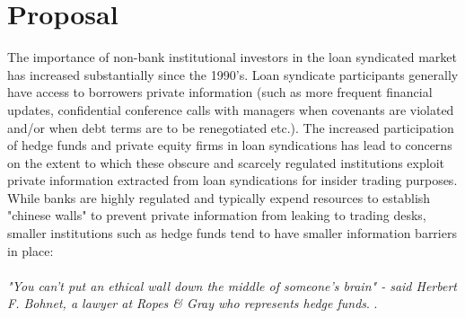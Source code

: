 \documentclass[english, 1p]{elsarticle}
\begin{document}
\maketitle

 

\section{Proposal} 


The importance of non-bank institutional investors in the loan syndicated market has increased substantially since the 1990's. Loan syndicate participants generally have access to borrowers private information (such as more frequent financial updates, confidential conference calls with managers when covenants are violated and/or when debt terms are to be renegotiated etc.).  
The increased participation of hedge funds and private equity firms in loan syndications has lead to concerns on the extent to which these obscure and scarcely regulated institutions exploit private information extracted from loan syndications for insider trading purposes. While banks are highly regulated and typically expend resources to establish "chinese walls" to prevent private information from leaking to trading desks, smaller institutions such as hedge funds tend to have smaller information barriers in place: \\
\\
\textit{"You can't put an ethical wall down the middle of someone's brain" - said Herbert F. Bohnet, a lawyer at Ropes \& Gray who represents hedge funds}. \citep[\textit{The New York Times}]{NYTOct2006}. \\
\end{document}
